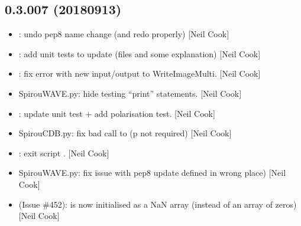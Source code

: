 \documentclass[a4paper,10pt,english]{report}
\begin{document}
\subsection{0.3.007 (2018\sphinxhyphen{}09\sphinxhyphen{}13)}
\label{\detokenize{misc/changelog:id345}}\begin{itemize}
\item {} 
: undo pep8 name change (and redo properly) {[}Neil
Cook{]}

\item {} 
: add unit tests to update (files and some
explanation) {[}Neil Cook{]}

\item {} 
: fix error with new input/output to WriteImageMulti.
{[}Neil Cook{]}

\item {} 
SpirouWAVE.py: hide testing “print” statements. {[}Neil Cook{]}

\item {} 
: update unit test + add polarisation test. {[}Neil Cook{]}

\item {} 
SpirouCDB.py: fix bad call to  (p not required) {[}Neil
Cook{]}

\item {} 
: exit script . {[}Neil Cook{]}

\item {} 
SpirouWAVE.py: fix issue with pep8 update  defined in wrong
place) {[}Neil Cook{]}

\item {} 
 (Issue \#452):  is now initialised as a NaN
array (instead of an array of zeros) {[}Neil Cook{]}

\end{itemize}
\end{document}
